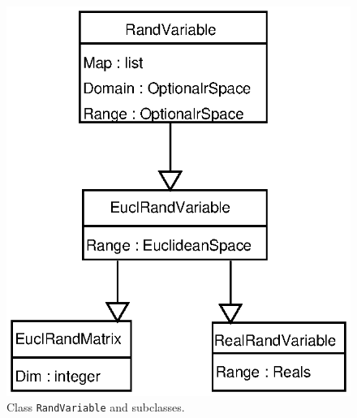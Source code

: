 \documentclass[11pt]{article}
\begin{document}
\begin{figure}[!ht]
\begin{center}
    \includegraphics[scale=1.0]{RandVariable.eps}
  \fi
  \caption[Class {\tt RandVariable} and Subclasses]{Class
    {\tt RandVariable} and subclasses.}
  \label{ap.Rpack.RandVar.dia1}
\end{center}
\end{figure}
\newpage
\end{document}
